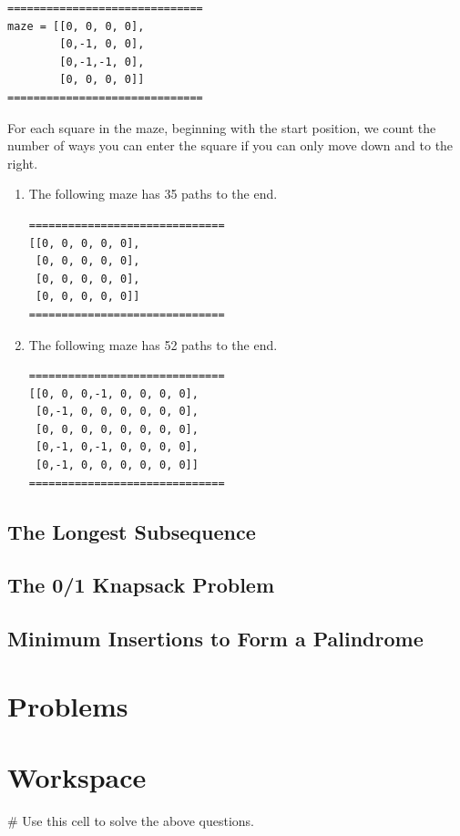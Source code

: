 \documentclass{ximera}
\begin{document}
\begin{verbatim}
==============================
maze = [[0, 0, 0, 0],
        [0,-1, 0, 0],
        [0,-1,-1, 0],
        [0, 0, 0, 0]]
==============================
\end{verbatim}

For each square in the maze, beginning with the start position, we count the number of ways you can enter the square if you can only move down and to the right.


\begin{enumerate}
	\item The following maze has 35 paths to the end.
\begin{verbatim}
==============================
[[0, 0, 0, 0, 0],
 [0, 0, 0, 0, 0],
 [0, 0, 0, 0, 0],
 [0, 0, 0, 0, 0]]
==============================
\end{verbatim}
	   \item The following maze has 52 paths to the end.
\begin{verbatim}
==============================
[[0, 0, 0,-1, 0, 0, 0, 0],
 [0,-1, 0, 0, 0, 0, 0, 0],
 [0, 0, 0, 0, 0, 0, 0, 0],
 [0,-1, 0,-1, 0, 0, 0, 0],
 [0,-1, 0, 0, 0, 0, 0, 0]]
==============================
\end{verbatim}
\end{enumerate}
		

\subsection{The Longest Subsequence}



\subsection{The 0/1 Knapsack Problem}



\subsection{Minimum Insertions to Form a Palindrome}



\section{Problems}


\begin{question}
\end{question}

\section{Workspace}

\begin{sageCell}
# Use this cell to solve the above questions.
\end{sageCell}
\end{document}
